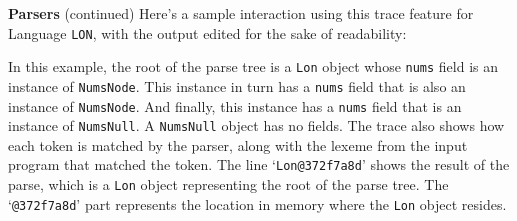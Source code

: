 \begin{minipage}[t]{\sw}
\slidenumber
\LARGE
{\bf Parsers} (continued)\exx
Here's a sample interaction using this trace feature
for Language \verb'LON',
with the output edited for the sake of readability:
{\Large
{}
}
In this example,
the root of the parse tree is a \verb'Lon' object
whose \verb'nums' field is an instance of \verb'NumsNode'.
This instance in turn has a \verb'nums' field that is also
an instance of \verb'NumsNode'.
And finally, this instance has a \verb'nums' field
that is an instance of \verb'NumsNull'.
A \verb'NumsNull' object has no fields.
The trace also shows how each token is matched by the parser,
along with the lexeme
from the input program that matched the token.
The line `\verb'Lon@372f7a8d'' shows the result
of the parse, which is a \verb'Lon' object
representing the root of the parse tree.
The `\verb'@372f7a8d'' part represents the location
in memory where the \verb'Lon' object resides.
\end{minipage}
\clearpage
